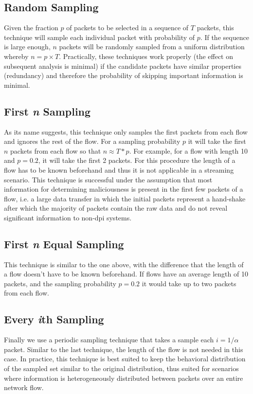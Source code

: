 \documentclass[conference]{IEEEtran}
\begin{document}
\subsection{Random Sampling}

Given the fraction $p$ of packets to be selected in a sequence of $T$ packets, this technique will sample each individual packet with probability of $p$. If the sequence is large enough, $n$ packets will be randomly sampled from a uniform distribution whereby $n= p \times T$. Practically, these techniques work properly (the effect on subsequent analysis is minimal) if the candidate packets have similar properties (redundancy) and therefore the probability of skipping important information is minimal.

\subsection{First \emph{n} Sampling}
As its name suggests, this technique only samples the first packets from each flow and ignores the rest of the flow. For a sampling probability $p$ it will take the first $n$ packets from each flow so that $n \approx T * p$. For example, for a flow with length 10 and $p=0.2$, it will take the first 2 packets. For this procedure the length of a flow has to be known beforehand and thus it is not applicable in a streaming scenario. This technique is successful under the assumption that most information for determining maliciousness is present in the first few packets of a flow, i.e. a large data transfer in which the initial packets represent a hand-shake after which the majority of packets contain the raw data and do not reveal significant information to non-\gls{dpi} systems.

\subsection{First \emph{n} Equal Sampling}
This technique is similar to the one above, with the difference that the length of a flow doesn't have to be known beforehand. If flows have an average length of 10 packets, and the sampling probability $p=0.2$ it would take up to two packets from each flow. 

\subsection{Every \emph{i}th Sampling}
Finally we use a periodic sampling technique that takes a sample each $i= 1/ \alpha$ packet. Similar to the last technique, the length of the flow is not needed in this case. In practice, this technique is best suited to keep the behavioral distribution of the sampled set similar to the original distribution, thus suited for scenarios where information is heterogeneously distributed between packets over an entire network flow.
\end{document}
